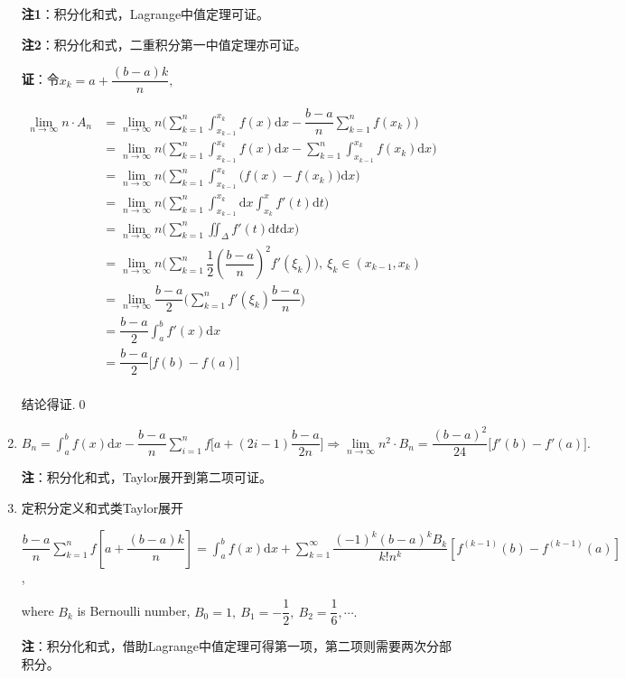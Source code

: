 \documentclass[UTF8]{ctexart}
\numberwithin{equation}{section}
\numberwithin{figure}{section}
\numberwithin{table}{section}
\newcommand\dif{\mathrm{d}}
\newcommand\dis{\displaystyle}
\newcommand\limn{\dis\lim\limits_{n\to\infty}}
\newcommand\sumk{\dis\sum\limits_{k=1}^{\infty}}
\newcommand\sumkfn{\dis\sum\limits_{k=1}^n}
\newcommand\intd{\dis\int}
\newcommand\intab{\dis\int_a^b}
\begin{document}
\begin{spacing}{2}
\begin{enumerate}[itemindent=1.4em, label=(\arabic*)]
\textbf{注1}：积分化和式，Lagrange中值定理可证。

\textbf{注2}：积分化和式，二重积分第一中值定理亦可证。

\textbf{证}：令$x_k=a+\dfrac{(b-a)k}{n},$

\begin{center}
$\begin{aligned}
\limn n\cdot A_n&=
\limn n\Bigg(\sumkfn\intd_{x_{k-1}}^{x_k} f(x)\dif x-\dfrac{b-a}{n}\sumkfn f(x_k)\Bigg)\\
&=\limn n\Bigg(\sumkfn\intd_{x_{k-1}}^{x_k} f(x)\dif x
-\sumkfn \intd_{x_{k-1}}^{x_k} f(x_k)\dif x\Bigg)\\
&=\limn n\Bigg(\sumkfn\intd_{x_{k-1}}^{x_k} \Big(f(x)- f(x_k)\Big)\dif x\Bigg)\\
&=\limn n\Bigg(\sumkfn\intd_{x_{k-1}}^{x_k} \dif x
\intd_{x_k}^x f'(t)\dif t\Bigg)\\
&=\limn n\Bigg(\sumkfn\iint_\Delta f'(t)\dif t\dif x\Bigg)\\
&=\limn n\Bigg(\sumkfn \dfrac{1}{2}\left(\dfrac{b-a}{n}\right)^2f'(\xi_k)\Bigg),\ 
\xi_k\in(x_{k-1},x_k)\\
&=\limn \dfrac{b-a}{2}\Bigg(\sumkfn f'(\xi_k)\dfrac{b-a}{n}\Bigg)\\
&=\dfrac{b-a}{2}\intd_a^b f'(x)\dif x\\
&=\dfrac{b-a}{2}\big[f(b)-f(a)\big]\\
\end{aligned}$
\end{center}

结论得证.\qed

\item $B_n=\intab f(x)\dif x-\dfrac{b-a}{n}\dis\sum\limits_{i=1}^nf\Bigg[
a+(2i-1)\dfrac{b-a}{2n}\Bigg]\Longrightarrow\limn n^2\cdot B_n=\dfrac{(b-a)^2}{24}\big[f'(b)-f'(a)\big].$

\vspace{0.3cm}

\textbf{注}：积分化和式，Taylor展开到第二项可证。

\item 定积分定义和式类Taylor展开

$\dfrac{b-a}{n}\dis\sum\limits_{k=1}^nf\left[a+\dfrac{(b-a)k}{n}\right]=
\intab f(x)\dif x+\sumk\dfrac{(-1)^k(b-a)^kB_k}{k!n^k}
\left[f^{(k-1)}(b)-f^{(k-1)}(a)\right]$, 

where $B_k$ is Bernoulli number, $B_0=1,\ B_1=-\dfrac{1}{2},\ B_2=\dfrac{1}{6},\cdots.$

\textbf{注}：积分化和式，借助Lagrange中值定理可得第一项，第二项则需要两次分部积分。


\end{enumerate}
\end{spacing}
\end{document}
